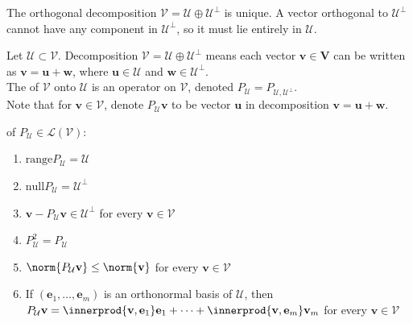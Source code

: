 The orthogonal decomposition $\mathcal{V} = \mathcal{U} \oplus \mathcal{U}^{\perp}$ is unique. A vector orthogonal to $\mathcal{U}^{\perp}$ cannot have any component in $\mathcal{U}^{\perp}$, so it must lie entirely in $\mathcal{U}$.

\begin{definition} Let $\mathcal{U} \subset \mathcal{V}$. Decomposition $\mathcal{V} = \mathcal{U} \oplus \mathcal{U}^{\perp}$ means each vector $\mathbf{v} \in \mathbf{V}$ can be written as $\mathbf{v} = \mathbf{u} + \mathbf{w}$, where $\mathbf{u} \in \mathcal{U}$ and $\mathbf{w} \in \mathcal{U}^{\perp}$.\\
The  of $\mathcal{V}$ onto $\mathcal{U}$ is an operator on $\mathcal{V}$, denoted $P_{\mathcal{U}} = P_{\mathcal{U}, \mathcal{U}^{\perp}}$.\\
Note that for $\mathbf{v} \in \mathcal{V}$, denote $P_{\mathcal{U}}\mathbf{v}$ to be vector $\mathbf{u}$ in decomposition $\mathbf{v} = \mathbf{u} + \mathbf{w}$.
\end{definition}

\begin{remark}  of $P_{\mathcal{U}} \in \mathcal{L}(\mathcal{V})$:
\begin{enumerate}[label=\roman*.]
\setlength{\itemsep}{0pt}
\item $\text{range}P_{\mathcal{U}} = \mathcal{U}$
\item $\text{null}P_{\mathcal{U}} = \mathcal{U}^{\perp}$
\item $\mathbf{v} - P_{\mathcal{U}}\mathbf{v} \in \mathcal{U}^{\perp}$ for every $\mathbf{v} \in \mathcal{V}$
\item $P_{\mathcal{U}}^2 = P_{\mathcal{U}}$
\item $\norm{P_{\mathcal{U}} \mathbf{v}} \leq \norm{\mathbf{v}}$ for every $\mathbf{v} \in \mathcal{V}$
\item If $(\mathbf{e}_1, \ldots, \mathbf{e}_m)$ is an orthonormal basis of $\mathcal{U}$, then $P_{\mathcal{U}} \mathbf{v} = \innerprod{\mathbf{v}, \mathbf{e}_1}\mathbf{e}_1 + \cdots + \innerprod{\mathbf{v}, \mathbf{e}_m}\mathbf{v}_m$ for every $\mathbf{v} \in \mathcal{V}$
\end{enumerate}
\end{remark}


